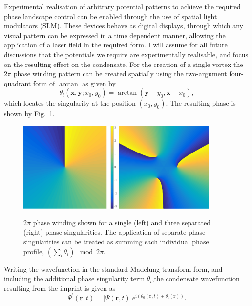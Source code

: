 Experimental realisation of arbitrary potential patterns to achieve the required phase landscape control can be enabled through the use of spatial light modulators (SLM). These devices behave as digital displays, through which any visual pattern can be expressed in a time dependent manner, allowing the application of a laser field in the required form. I will assume for all future discussions that the potentials we require are experimentally realisable, and focus on the resulting effect on the condensate. For the creation of a single vortex the $2\pi$ phase winding pattern can be created spatially using the two-argument four-quadrant form of $\arctan$ as given by
\begin{equation}
    \theta_i(\mathbf{x},\mathbf{y};x_0,y_0) = \arctan(\mathbf{y}-y_0,\mathbf{x}-x_0),
\end{equation}
which locates the singularity at the position $\left(x_0,y_0\right)$. The resulting phase is shown by Fig.~\ref{fig:atan2phase}.
\begin{figure}\centering
    \includegraphics[width=0.45\textwidth]{Images/ch4_vtx/2pi.pdf}
    \includegraphics[width=0.435\textwidth]{Images/ch4_vtx/3_2pi.pdf}
    \caption{$2\pi$ phase winding shown for a single (left) and three separated (right) phase singularities. The application of separate phase singularities can be treated as summing each individual phase profile, $\left(\displaystyle\sum\limits_i \theta_i \right)\mod 2\pi$.}\label{fig:atan2phase}
\end{figure}
Writing the wavefunction in the standard Madelung transform form, and including the additional phase singularity term $\theta_i$,the condensate wavefunction resulting from the imprint is given as
\begin{equation}
    \Psi^{'}(\mathbf{r},t) = |\Psi(\mathbf{r},t)|e^{\text{i}(\theta_0(\mathbf{r},t) + \theta_i(\mathbf{r}))}.
\end{equation}

